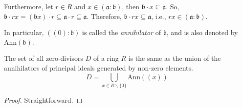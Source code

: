  Furthermore, let \(r \in R\) and  \(x \in (\mathfrak{a}: \mathfrak{b})\), then \(\mathfrak{b} \cdot x \subseteq \mathfrak{a}\). So, \(\mathfrak{b}\cdot rx = (\mathfrak{b}x) \cdot r \subseteq \mathfrak{a} \cdot r \subseteq \mathfrak{a}\). Therefore, \(\mathfrak{b} \cdot rx \subseteq \mathfrak{a}\), i.e., \(rx \in (\mathfrak{a}: \mathfrak{b})\).

 In particular, \(((0): \mathfrak{b})\) is called the \emph{annihilator} of \(\mathfrak{b}\), and is also denoted by \(\text{Ann}(\mathfrak{b})\).

\begin{proposition}
    The set of all zero-divisors \(D\) of a ring \(R\) is the same as the union of the annihilators of principal ideals generated by non-zero elements.
    \[
        D = \bigcup_{x \in R \smallsetminus \{0\}} \text{Ann}((x))
    \] 
\end{proposition}
\begin{proof}
    Straightforward.    
\end{proof}
\begin{example}
\end{example}

